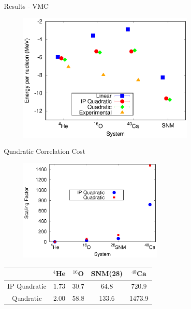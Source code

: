 \documentclass{beamer}
\begin{document}
\begin{frame}{Results - VMC}
   \begin{figure}[h]
      \centering
      \includegraphics[width=0.8\textwidth]{../figures/energy_vmc.eps}
   \end{figure}
\end{frame}

\begin{frame}{Quadratic Correlation Cost}
\begin{figure}[h]
   \centering
   \includegraphics[width=0.65\textwidth]{../figures/scaling.eps}
\end{figure}
\vspace{-0.2cm}
\begin{table}[h!]
   \centering
   \begin{tabular}{ccccc}
      \hline \hline
       & $^{4}$He & $^{16}$O & SNM(28) & $^{40}$Ca \\
      \hline
      IP Quadratic & 1.73 & 30.7 & 64.8 & 720.9 \\
      Quadratic & 2.00 & 58.8 & 133.6 & 1473.9 \\
      \hline \hline
   \end{tabular}
\end{table}
\end{frame}
\end{document}
